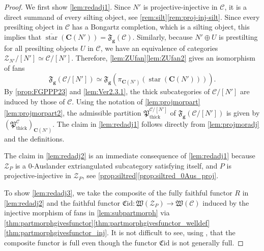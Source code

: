 \documentclass[10pt,twoside, a4paper,reqno]{amsart}
\DeclareMathOperator{\thick}{thick}
\DeclareMathOperator{\starr}{star}
\newcommand{\partfan}[1]{\mathfrak{F}_{\bfg}(#1)}
\newcommand{\catof}{\mathfrak{C}}
\newcommand{\Wfrak}{\mathfrak{W}}
\newcommand{\Pfrak}{\mathfrak{P}}
\newcommand{\calC}{\mathcal{C}}
\newcommand{\calZ}{\mathcal{Z}}
\newcommand{\boldC}{\mathbf{C}}
\newcommand{\bfg}{\mathbf{g}}
\theoremstyle{definition}
\begin{document}
\begin{proof}
We first show \eqref{lem:redadj1}. Since $N'$ is projective-injective in $\calC$, it is a direct summand of every silting object, see \cref{rem:silt}\eqref{rem:proj-inj-silt}. Since every presilting object in $\calC$ has a Bongartz completion, which is a silting object, this implies that $\overline{\starr}(\boldC(N')) = \partfan{\calC}$. 
	Similarly, because $N'\oplus U$ is prestilting for all presilting objects $U$ in $\calC$, we have an equivalence of categories $\calZ_{N'}/[N'] \simeq \calC/[N']$. Therefore, \cref{lem:ZUfan}\eqref{lem:ZUfan2} gives an isomorphism of fans 
	\[ \partfan{\calC/[N']} \simeq \partfan{\pi_{\boldC(N')}(\starr(\boldC(N')))}. \]
	By \cref{prop:FGPPP23} and \cref{lem:Ver2.3.1}, the thick subcategories of $\calC/[N']$ are induced by those of $\calC$. Using the notation of \cref{lem:projmorpart}\eqref{lem:projmorpart2}, the admissible partition $\Pfrak_{\thick}^{\calC/[N']}$ of $\partfan{\calC/[N']}$ is given by $(\Pfrak_{\thick}^{\calC})_{\boldC(N')}$. The claim in \eqref{lem:redadj1} follows directly from \cref{lem:projmoradj} and the definitions.
    
    The claim in \eqref{lem:redadj2} is an immediate consequence of \eqref{lem:redadj1} because $\calZ_P$ is a 0-Auslander extriangulated subcategory satisfying  itself, and $P$ is projective-injective in $\calZ_P$, see \cref{prop:siltred}\eqref{prop:siltred_0Aus_proj}. 
    
    
   To show \eqref{lem:redadj3}, we take the composite of the fully faithful functor $R$ in \eqref{lem:redadj2} and the faithful functor $\catof \mathrm{id}: \Wfrak(\calZ_P) \to \Wfrak(\calC)$ induced by the injective morphism of fans in \cref{lem:subpartmorph} via \cref{thm:partmorphgivesfunctor}\eqref{thm:partmorphgivesfunctor_welldef}\eqref{thm:partmorphgivesfunctor_inj}. It is not difficult to see, using \cite[Cor. 3.6]{Kai23}, that the composite functor is full even though the functor $\catof \mathrm{id}$ is not generally full.
\end{proof}
\end{document}
